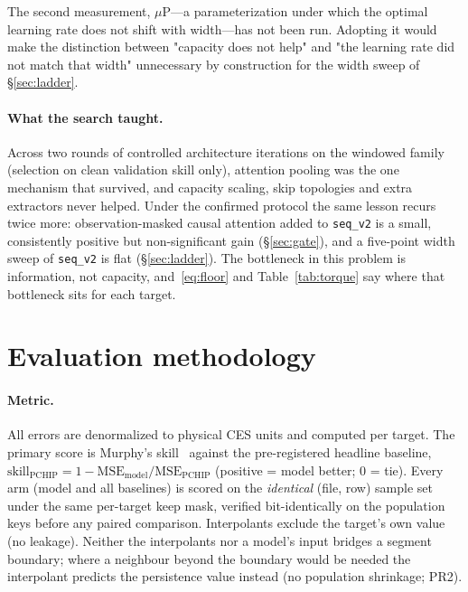 \documentclass[10pt]{article}
\newcommand{\skillp}{\ensuremath{\mathrm{skill}_{\mathrm{PCHIP}}}}
\newcommand{\seqv}{\texttt{seq\_v2}}
\begin{document}
The second measurement, $\mu$P---a parameterization under which the optimal learning rate
does not shift with width---has not been run. Adopting it would make the distinction
between "capacity does not help" and "the learning rate did not match that width"
unnecessary by construction for the width sweep of \S\ref{sec:ladder}.

\paragraph{What the search taught.}
Across two rounds of controlled architecture iterations on the windowed family
(selection on clean validation skill only), attention pooling was the one mechanism
that survived, and capacity scaling, skip topologies and extra extractors never
helped. Under the confirmed protocol the same lesson recurs twice more:
observation-masked causal attention added to \seqv{} is a small, consistently
positive but non-significant gain (\S\ref{sec:gate}), and a five-point width
sweep of \seqv{} is flat (\S\ref{sec:ladder}). The bottleneck in this problem is
information, not capacity, and~\eqref{eq:floor} and Table~\ref{tab:torque} say where
that bottleneck sits for each target.

\section{Evaluation methodology}
\label{sec:eval}

\paragraph{Metric.}
All errors are denormalized to physical CES units and computed per target. The
primary score is Murphy's skill~\citep{murphy1988} against the pre-registered
headline baseline,
$\skillp = 1 - \mathrm{MSE}_{\mathrm{model}}/\mathrm{MSE}_{\mathrm{PCHIP}}$
(positive = model better; 0 = tie). Every arm (model and all baselines) is scored
on the \emph{identical} (file, row) sample set under the same per-target keep
mask, verified bit-identically on the population keys before any paired
comparison. Interpolants exclude the target's own value (no leakage). Neither the
interpolants nor a model's input bridges a segment boundary; where a neighbour
beyond the boundary would be needed the interpolant predicts the persistence value
instead (no population shrinkage; PR2).
\end{document}
